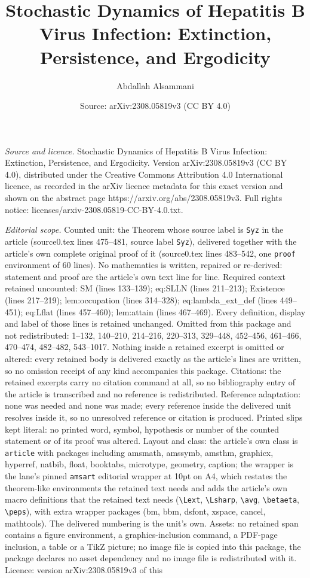 \documentclass[10pt,a4paper]{amsart}
\title[Stochastic Dynamics of Hepatitis B Virus Infection: Extincti]{Stochastic Dynamics of Hepatitis B Virus Infection: Extinction, Persistence, and Ergodicity}
\author{Abdallah Alsammani}
\date{Source: arXiv:2308.05819v3 (CC BY 4.0)}
\begin{document}
\maketitle

\noindent\emph{Source and licence.} Stochastic Dynamics of Hepatitis B Virus Infection: Extinction, Persistence, and Ergodicity. Version arXiv:2308.05819v3 (CC BY 4.0), distributed under the Creative Commons Attribution 4.0 International licence, as recorded in the arXiv licence metadata for this exact version and shown on the abstract page https://arxiv.org/abs/2308.05819v3. Full rights notice: licenses/arxiv-2308.05819-CC-BY-4.0.txt.\par\smallskip

\noindent\textit{Editorial scope.} Counted unit: the Theorem whose source label is \texttt{Syz} in the article (source0.tex lines 475--481, source label \texttt{Syz}), delivered together with the article's own complete original proof of it (source0.tex lines 483--542, one \texttt{proof} environment of 60 lines). No mathematics is written, repaired or re-derived: statement and proof are the article's own text line for line. Required context retained uncounted: SM (lines 133--139); eq:SLLN (lines 211--213); Existence (lines 217--219); lem:occupation (lines 314--328); eq:lambda\_ext\_def (lines 449--451); eq:Lflat (lines 457--460); lem:attain (lines 467--469). Every definition, display and label of those lines is retained unchanged. Omitted from this package and not redistributed: 1--132, 140--210, 214--216, 220--313, 329--448, 452--456, 461--466, 470--474, 482--482, 543--1017. Nothing inside a retained excerpt is omitted or altered: every retained body is delivered exactly as the article's lines are written, so no omission receipt of any kind accompanies this package. Citations: the retained excerpts carry no citation command at all, so no bibliography entry of the article is transcribed and no reference is redistributed. Reference adaptation: none was needed and none was made; every reference inside the delivered unit resolves inside it, so no unresolved reference or citation is produced. Printed slips kept literal: no printed word, symbol, hypothesis or number of the counted statement or of its proof was altered. Layout and class: the article's own class is \texttt{article} with packages including amsmath, amssymb, amsthm, graphicx, hyperref, natbib, float, booktabs, microtype, geometry, caption; the wrapper is the lane's pinned \texttt{amsart} editorial wrapper at 10pt on A4, which restates the theorem-like environments the retained text needs and adds the article's own macro definitions that the retained text needs (\texttt{\textbackslash Lext}, \texttt{\textbackslash Lsharp}, \texttt{\textbackslash avg}, \texttt{\textbackslash betaeta}, \texttt{\textbackslash peps}), with extra wrapper packages (bm, bbm, dsfont, xspace, cancel, mathtools). The delivered numbering is the unit's own. Assets: no retained span contains a figure environment, a graphics-inclusion command, a PDF-page inclusion, a table or a TikZ picture; no image file is copied into this package, the package declares no asset dependency and no image file is redistributed with it. Licence: version arXiv:2308.05819v3 of this 
\end{document}
